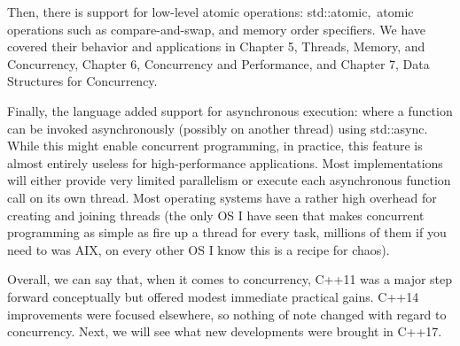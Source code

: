 Then, there is support for low-level atomic operations: std::atomic, atomic operations such as compare-and-swap, and memory order specifiers. We have covered their behavior and applications in Chapter 5, Threads, Memory, and Concurrency, Chapter 6, Concurrency and Performance, and Chapter 7, Data Structures for Concurrency. 

Finally, the language added support for asynchronous execution: where a function can be invoked asynchronously (possibly on another thread) using std::async. While this might enable concurrent programming, in practice, this feature is almost entirely useless for high-performance applications. Most implementations will either provide very limited parallelism or execute each asynchronous function call on its own thread. Most operating systems have a rather high overhead for creating and joining threads (the only OS I have seen that makes concurrent programming as simple as fire up a thread for every task, millions of them if you need to was AIX, on every other OS I know this is a recipe for chaos). 

Overall, we can say that, when it comes to concurrency, C++11 was a major step forward conceptually but offered modest immediate practical gains. C++14 improvements were focused elsewhere, so nothing of note changed with regard to concurrency. Next, we will see what new developments were brought in C++17.





































